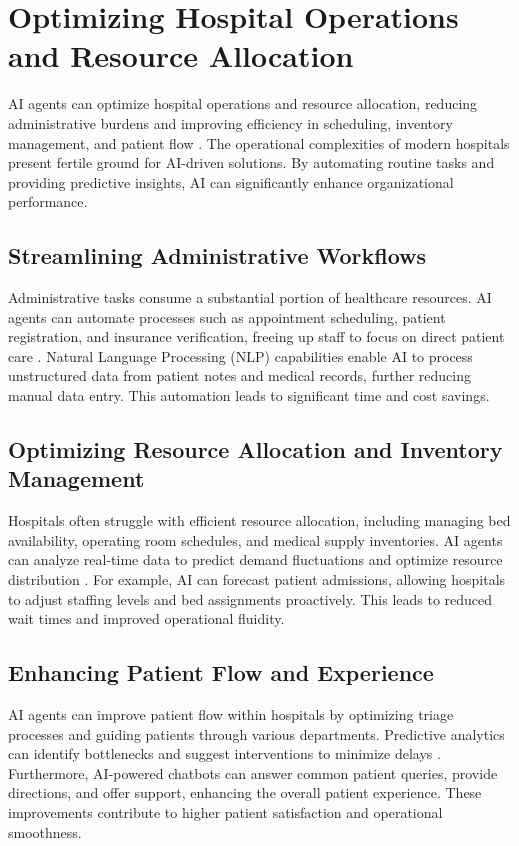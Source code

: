 \documentclass[12pt,a4paper]{article}
\begin{document}
\section{Optimizing Hospital Operations and Resource Allocation}
AI agents can optimize hospital operations and resource allocation, reducing administrative burdens and improving efficiency in scheduling, inventory management, and patient flow \cite{davenport2019ai}. The operational complexities of modern hospitals present fertile ground for AI-driven solutions. By automating routine tasks and providing predictive insights, AI can significantly enhance organizational performance.

\subsection{Streamlining Administrative Workflows}
Administrative tasks consume a substantial portion of healthcare resources. AI agents can automate processes such as appointment scheduling, patient registration, and insurance verification, freeing up staff to focus on direct patient care \cite{practolytics_medical_billing}. Natural Language Processing (NLP) capabilities enable AI to process unstructured data from patient notes and medical records, further reducing manual data entry. This automation leads to significant time and cost savings.

\subsection{Optimizing Resource Allocation and Inventory Management}
Hospitals often struggle with efficient resource allocation, including managing bed availability, operating room schedules, and medical supply inventories. AI agents can analyze real-time data to predict demand fluctuations and optimize resource distribution \cite{zynxhealth_clinical_decision_support}. For example, AI can forecast patient admissions, allowing hospitals to adjust staffing levels and bed assignments proactively. This leads to reduced wait times and improved operational fluidity.

\subsection{Enhancing Patient Flow and Experience}
AI agents can improve patient flow within hospitals by optimizing triage processes and guiding patients through various departments. Predictive analytics can identify bottlenecks and suggest interventions to minimize delays \cite{televox_patient_engagement}. Furthermore, AI-powered chatbots can answer common patient queries, provide directions, and offer support, enhancing the overall patient experience. These improvements contribute to higher patient satisfaction and operational smoothness.
\end{document}
